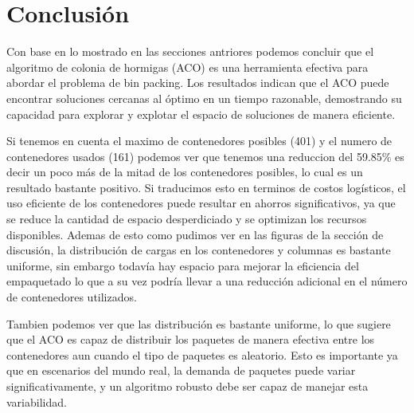 \section{Conclusión}

Con base en lo mostrado en las secciones antriores podemos concluir que el algoritmo de colonia de hormigas (ACO) es una
herramienta efectiva para abordar el problema de bin packing. Los resultados indican que el ACO puede encontrar soluciones cercanas al óptimo en un tiempo razonable, 
demostrando su capacidad para explorar y explotar el espacio de soluciones de manera eficiente.

Si tenemos en cuenta el maximo de contenedores posibles (401) y el numero de contenedores usados (161) podemos ver que tenemos una reduccion del 59.85\% es decir un poco más
de la mitad de los contenedores posibles, lo cual es un resultado bastante positivo. Si traducimos esto en terminos de costos logísticos, el uso eficiente de los contenedores
puede resultar en ahorros significativos, ya que se reduce la cantidad de espacio desperdiciado y se optimizan los recursos disponibles. Ademas de esto como pudimos ver en las
figuras de la sección de discusión, la distribución de cargas en los contenedores y columnas es bastante uniforme, sin embargo todavía hay espacio para mejorar la eficiencia 
del empaquetado lo que a su vez podría llevar a una reducción adicional en el número de contenedores utilizados.

Tambien podemos ver que las distribución es bastante uniforme, lo que sugiere que el ACO es capaz de distribuir los paquetes de manera efectiva entre los contenedores aun cuando
el tipo de paquetes es aleatorio. Esto es importante ya que en escenarios del mundo real, la demanda de paquetes puede variar significativamente, y un algoritmo robusto debe ser capaz
de manejar esta variabilidad.
